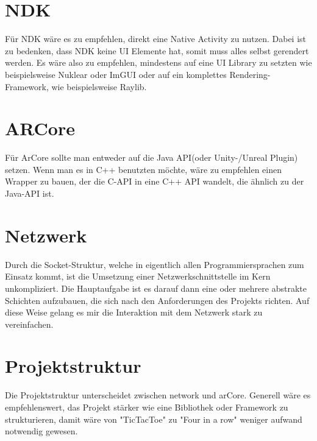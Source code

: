\section{NDK}
Für NDK wäre es zu empfehlen, direkt eine Native Activity zu nutzen.
Dabei ist zu bedenken, dass NDK keine UI Elemente hat, somit muss alles selbst
gerendert werden. Es wäre also zu empfehlen, mindestens auf eine UI Library zu setzten
wie beispielsweise Nuklear oder ImGUI oder auf ein komplettes Rendering-Framework,
wie beispielsweise Raylib.

\section{ARCore}
Für ArCore sollte man entweder auf die Java API(oder Unity-/Unreal Plugin) setzen.
Wenn man es in C++ benutzten möchte, wäre zu empfehlen einen Wrapper zu bauen, der die
C-API in eine C++ API wandelt, die ähnlich zu der Java-API ist.

\section{Netzwerk}
Durch die Socket-Struktur, welche in eigentlich allen Programmiersprachen zum Einsatz kommt,
ist die Umsetzung einer Netzwerkschnittstelle im Kern unkompliziert. Die Hauptaufgabe ist es darauf
dann eine oder mehrere abstrakte Schichten aufzubauen, die sich nach den Anforderungen des Projekts
richten. Auf diese Weise gelang es mir die Interaktion mit dem Netzwerk stark zu vereinfachen.

\section{Projektstruktur}
Die Projektstruktur unterscheidet zwischen network und arCore. Generell wäre es empfehlenswert, das Projekt stärker wie eine Bibliothek oder Framework zu strukturieren, damit wäre von "TicTacToe" zu "Four in a row" weniger aufwand notwendig gewesen.
